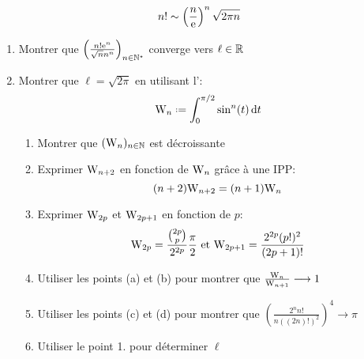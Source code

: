 \begin{theo}{}
    $$n! \sim \left(\frac{n}{\mathrm{e}}\right)^n \sqrt{2 \pi n}$$
\end{theo}

\begin{elem_preuve}
    \begin{enumerate}
        \item Montrer que $\left( \frac{n!\mathrm{e}^n}{\sqrt{n}n^n} \right)_{n \in \mathbb{N}^\star}$ converge vers $\ell \in \mathbb{R}$
        \item Montrer que $\ell = \sqrt{2 \pi}$ en utilisant l':
        $$\Wallis_n \defeq \int_{0}^{\pi/2}\sin^n(t) \d t$$
        \begin{enumerate}
            \item Montrer que $(\mathrm{W}_n)_{n \in \mathbb{N}}$ est décroissante
            \item Exprimer $\mathrm{W}_{n+2}$ en fonction de $\mathrm{W}_n$ grâce à une IPP: $$(n+2)\mathrm{W}_{n+2} = (n+1)\mathrm{W}_n$$
            \item Exprimer $\mathrm{W}_{2p}$ et $\mathrm{W}_{2p+1}$ en fonction de $p$:\\
            $$\mathrm{W}_{2p} = \frac{\binom{2p}{p}}{2^{2p}}\frac{\pi}{2} \text{ et } \mathrm{W}_{2p+1} = \frac{2^{2p} (p!)^2}{(2p+1)!}$$
            \item Utiliser les points (a) et (b) pour montrer que $\frac{\mathrm{W}_n}{\mathrm{W}_{n+1}} \longrightarrow 1$
            \item Utiliser les points (c) et (d) pour montrer que $\left ( \frac{2^n n!}{n ((2n)!)^2} \right)^4 \longrightarrow \pi$
            \item Utiliser le point 1. pour déterminer $\ell$
        \end{enumerate}
    \end{enumerate}
\end{elem_preuve}

